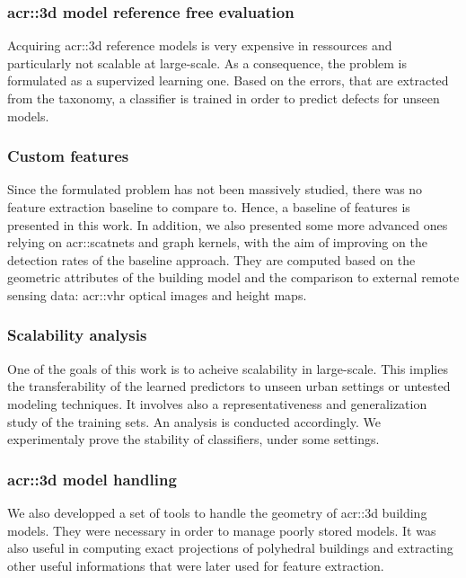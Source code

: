         \subsubsection{\texorpdfstring{\gls*{acr::3d}}{3D} model reference free evaluation}
            Acquiring \gls{acr::3d} reference models is very expensive in ressources and particularly not scalable at large-scale.
            As a consequence, the problem is formulated as a supervized learning one.
            Based on the errors, that are extracted from the taxonomy, a classifier is trained in order to predict defects for unseen models.

        \subsubsection{Custom features}
            Since the formulated problem has not been massively studied, there was no feature extraction baseline to compare to.
            Hence, a baseline of features is presented in this work.
            In addition, we also presented some more advanced ones relying on \glspl{acr::scatnet} and graph kernels, with the aim of improving on the detection rates of the baseline approach.
            They are computed based on the geometric attributes of the building model and the comparison to external remote sensing data: \gls{acr::vhr} optical images and height maps.
        
        \subsubsection{Scalability analysis}
            One of the goals of this work is to acheive scalability in large-scale.
            This implies the transferability of the learned predictors to unseen urban settings or untested modeling techniques.
            It involves also a representativeness and generalization study of the training sets.
            An analysis is conducted accordingly.
            We experimentaly prove the stability of classifiers, under some settings.
        
        \subsubsection{\texorpdfstring{\gls*{acr::3d}}{3D} model handling}
            We also developped a set of tools to handle the geometry of \gls{acr::3d} building models.
            They were necessary in order to manage poorly stored models.
            It was also useful in computing exact projections of polyhedral buildings and extracting other useful informations that were later used for feature extraction.

